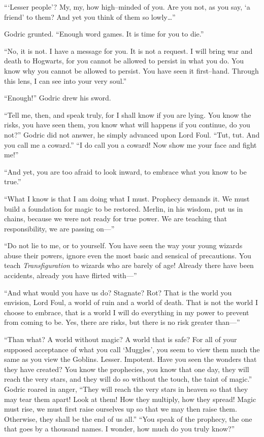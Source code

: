 “‘Lesser people’? My, my, how high\mbox{--}minded of you. Are you not, as you say, ‘a friend’ to them? And yet you think of them so lowly…”

Godric grunted. “Enough word games. It is time for you to die.”

“No, it is not. I have a message for you. It is not a request. I will bring war and death to Hogwarts, for you cannot be allowed to persist in what you do. You know why you cannot be allowed to persist. You have seen it first\mbox{--}hand. Through this lens, I can see into your very soul.”

“Enough!” Godric drew his sword.

“Tell me, then, and speak truly, for I shall know if you are lying. You know the risks, you have seen them, you know what will happens if you continue, do you not?” Godric did not answer, he simply advanced upon Lord Foul. “Tut, tut. And you call me a coward.”
\SmallVSpace
“I do call you a coward! Now show me your face and fight me!”

“And yet, you are too afraid to look inward, to embrace what you know to be true.”

“What I know is that I am doing what I must. Prophecy demands it. We must build a foundation for magic to be restored. Merlin, in his wisdom, put us in chains, because we were not ready for true power. We are teaching that responsibility, we are passing on\mbox{---}”

“Do not lie to me, or to yourself. You have seen the way your young wizards abuse their powers, ignore even the most basic and sensical of precautions. You teach \emph{Transfiguration} to wizards who are barely of age! Already there have been accidents, already you have flirted with\mbox{---}”

“And what would you have us do? Stagnate? Rot? That is the world you envision, Lord Foul, a world of ruin and a world of death. That is not the world I choose to embrace, that is a world I will do everything in my power to prevent from coming to be. Yes, there are risks, but there is no risk greater than\mbox{---}”

“Than what? A world without magic? A world that is safe? For all of your supposed acceptance of what you call ‘Muggles’, you seem to view them much the same as you view the Goblins. Lesser. Impotent. Have you seen the wonders that they have created? You know the prophecies, you know that one day, they will reach the very stars, and they will do so without the touch, the taint of magic.”
\SmallVSpace
Godric roared in anger, “They will reach the very stars in heaven so that they may tear them apart! Look at them! How they multiply, how they spread! Magic must rise, we must first raise ourselves up so that we may then raise them.\\Otherwise, they shall be the end of us all.”
\SmallVSpace
“You speak of the prophecy, the one that goes by a thousand names. I wonder, how much do you truly know?”

